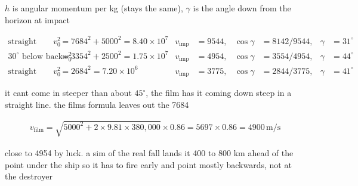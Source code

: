 \documentclass[11pt]{article}
\newcommand{\un}[1]{\,\mathrm{#1}}
\begin{document}
$h$ is angular momentum per kg (stays the same), $\gamma$ is the angle down from the horizon at impact

\begin{align*}
\text{straight down: } v_0^2 &= 7684^2 + 5000^2 = 8.40\times10^7 & v_{\text{imp}} &= 9544, & \cos\gamma &= 8142/9544, & \gamma &= 31^\circ\\
\text{30}^\circ\text{ below back: } v_0^2 &= 3354^2 + 2500^2 = 1.75\times10^7 & v_{\text{imp}} &= 4954, & \cos\gamma &= 3554/4954, & \gamma &= 44^\circ\\
\text{straight back: } v_0^2 &= 2684^2 = 7.20\times10^6 & v_{\text{imp}} &= 3775, & \cos\gamma &= 2844/3775, & \gamma &= 41^\circ
\end{align*}

it cant come in steeper than about $45^\circ$, the film has it coming down steep in a straight line. the films formula leaves out the 7684

\begin{align*}
v_{\text{film}} = \sqrt{5000^2 + 2 \times 9.81 \times 380{,}000} \times 0.86 = 5697 \times 0.86 = 4900\un{m/s}
\end{align*}

close to 4954 by luck. a sim of the real fall lands it 400 to 800 km ahead of the point under the ship so it has to fire early and point mostly backwards, not at the destroyer
\end{document}
